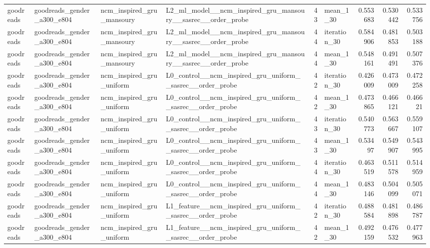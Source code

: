 \begin{table}[htbp!]
\begin{tabular}{llllrlrrr}
goodreads & goodreads\_gender\_a300\_e804 & ncm\_inspired\_gru\_mansoury & L2\_ml\_model\_\_ncm\_inspired\_gru\_mansoury\_\_sasrec\_\_order\_probe & 43 & mean\_1\_30 & 0.553683 & 0.530442 & 0.533756 \\
goodreads & goodreads\_gender\_a300\_e804 & ncm\_inspired\_gru\_mansoury & L2\_ml\_model\_\_ncm\_inspired\_gru\_mansoury\_\_sasrec\_\_order\_probe & 44 & iteration\_30 & 0.584906 & 0.481853 & 0.503188 \\
goodreads & goodreads\_gender\_a300\_e804 & ncm\_inspired\_gru\_mansoury & L2\_ml\_model\_\_ncm\_inspired\_gru\_mansoury\_\_sasrec\_\_order\_probe & 44 & mean\_1\_30 & 0.548161 & 0.491491 & 0.507376 \\
goodreads & goodreads\_gender\_a300\_e804 & ncm\_inspired\_gru\_uniform & L0\_control\_\_ncm\_inspired\_gru\_uniform\_\_sasrec\_\_order\_probe & 42 & iteration\_30 & 0.426009 & 0.473009 & 0.472258 \\
goodreads & goodreads\_gender\_a300\_e804 & ncm\_inspired\_gru\_uniform & L0\_control\_\_ncm\_inspired\_gru\_uniform\_\_sasrec\_\_order\_probe & 42 & mean\_1\_30 & 0.473865 & 0.466121 & 0.46621 \\
goodreads & goodreads\_gender\_a300\_e804 & ncm\_inspired\_gru\_uniform & L0\_control\_\_ncm\_inspired\_gru\_uniform\_\_sasrec\_\_order\_probe & 43 & iteration\_30 & 0.540773 & 0.563667 & 0.559107 \\
goodreads & goodreads\_gender\_a300\_e804 & ncm\_inspired\_gru\_uniform & L0\_control\_\_ncm\_inspired\_gru\_uniform\_\_sasrec\_\_order\_probe & 43 & mean\_1\_30 & 0.53497 & 0.549907 & 0.543995 \\
goodreads & goodreads\_gender\_a300\_e804 & ncm\_inspired\_gru\_uniform & L0\_control\_\_ncm\_inspired\_gru\_uniform\_\_sasrec\_\_order\_probe & 44 & iteration\_30 & 0.463519 & 0.511578 & 0.514959 \\
goodreads & goodreads\_gender\_a300\_e804 & ncm\_inspired\_gru\_uniform & L0\_control\_\_ncm\_inspired\_gru\_uniform\_\_sasrec\_\_order\_probe & 44 & mean\_1\_30 & 0.483146 & 0.504099 & 0.505071 \\
goodreads & goodreads\_gender\_a300\_e804 & ncm\_inspired\_gru\_uniform & L1\_feature\_\_ncm\_inspired\_gru\_uniform\_\_sasrec\_\_order\_probe & 42 & iteration\_30 & 0.488584 & 0.481898 & 0.486787 \\
goodreads & goodreads\_gender\_a300\_e804 & ncm\_inspired\_gru\_uniform & L1\_feature\_\_ncm\_inspired\_gru\_uniform\_\_sasrec\_\_order\_probe & 42 & mean\_1\_30 & 0.492159 & 0.476532 & 0.477963 \\

\end{tabular}
\end{table}
